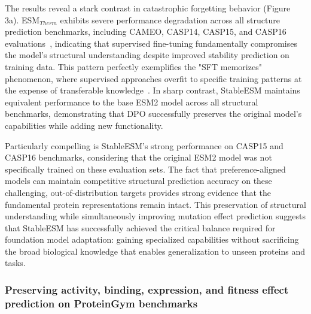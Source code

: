 \documentclass[]{fairmeta}
\begin{document}
The results reveal a stark contrast in catastrophic forgetting behavior (Figure 3a). ESM$_{Therm}$ exhibits severe performance degradation across all structure prediction benchmarks, including CAMEO, CASP14, CASP15, and CASP16 evaluations~\citep{yuan2025casp16}, indicating that supervised fine-tuning fundamentally compromises the model's structural understanding despite improved stability prediction on training data. This pattern perfectly exemplifies the "SFT memorizes" phenomenon, where supervised approaches overfit to specific training patterns at the expense of transferable knowledge~\citep{chu2025sft}. In sharp contrast, StableESM maintains equivalent performance to the base ESM2 model across all structural benchmarks, demonstrating that DPO successfully preserves the original model's capabilities while adding new functionality.

Particularly compelling is StableESM's strong performance on CASP15 and CASP16 benchmarks, considering that the original ESM2 model was not specifically trained on these evaluation sets. The fact that preference-aligned models can maintain competitive structural prediction accuracy on these challenging, out-of-distribution targets provides strong evidence that the fundamental protein representations remain intact. This preservation of structural understanding while simultaneously improving mutation effect prediction suggests that StableESM has successfully achieved the critical balance required for foundation model adaptation: gaining specialized capabilities without sacrificing the broad biological knowledge that enables generalization to unseen proteins and tasks.


\subsubsection{Preserving activity, binding, expression, and fitness effect prediction on ProteinGym benchmarks}
\end{document}
